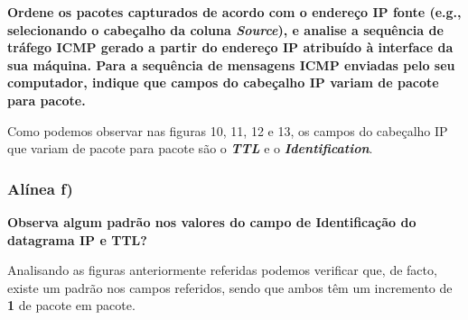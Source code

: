 \documentclass{article}
\begin{document}
\textbf{Ordene os pacotes capturados de acordo com o endereço IP fonte (e.g., selecionando o cabeçalho da coluna
\emph{Source}), e analise a sequência de tráfego ICMP gerado a partir do endereço IP atribuído à interface da sua
máquina. Para a sequência de mensagens ICMP enviadas pelo seu computador, indique que campos do cabeçalho IP variam de pacote para pacote.}\par\vspace{0.35cm}
\hspace{0.5cm}Como podemos observar nas figuras 10, 11, 12 e 13, os campos do cabeçalho IP que variam de pacote para pacote são o \emph{\textbf{TTL}} e o \emph{\textbf{Identification}}.\vspace{0.35cm}

\subsubsection{Alínea f)}\par

\textbf{Observa algum padrão nos valores do campo de Identificação do datagrama IP e TTL?}\par\vspace{0.35cm}
\hspace{0.5cm}Analisando as figuras anteriormente referidas podemos verificar que, de facto, existe um padrão nos campos referidos, sendo que ambos têm um incremento de \textbf{1} de pacote em pacote.\vspace{0.3cm}
\end{document}
